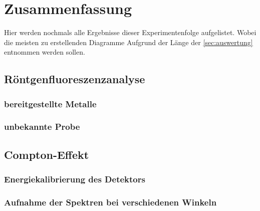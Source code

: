 \documentclass[12pt,english,ngerman]{scrartcl}
\begin{document}
\section{Zusammenfassung}\label{sec:zusammenfassung}

Hier werden nochmals alle Ergebnisse dieser Experimentenfolge aufgelistet.
Wobei die meisten zu erstellenden Diagramme Aufgrund der Länge der
\autoref{sec:auswertung} entnommen werden sollen.

\subsection{Röntgenfluoreszenzanalyse}

\subsubsection{bereitgestellte Metalle}


\subsubsection{unbekannte Probe}


\subsection{Compton-Effekt}

\subsubsection{Energiekalibrierung des Detektors}

\subsubsection{Aufnahme der Spektren bei verschiedenen Winkeln}


\newpage
\printbibliography
\listoffigures
\listoftables
\end{document}
